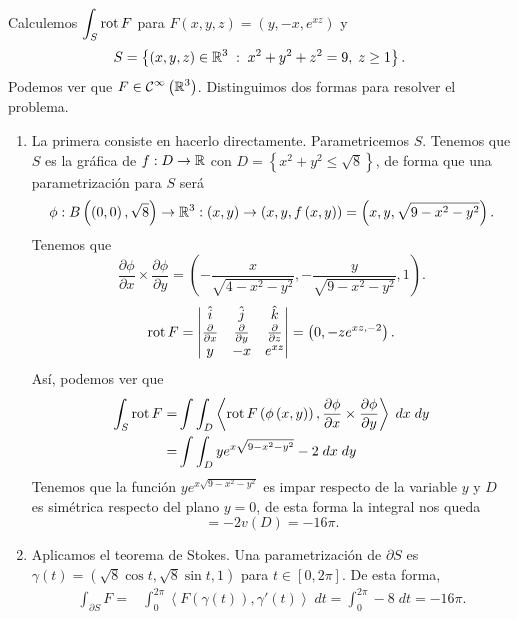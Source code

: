 \begin{eg}
	Calculemos $\displaystyle \int _{S}\operatorname{rot} F $ para $\displaystyle F\left(x,y,z\right)=\left(y,-x, e^{xz}\right) $ y 
	\[  S= \left\{ \left(x,y,z\right)\in \mathbb{R}^{3} \; : \; x^{2}+y^{2}+z^{2}=9, \; z \geq 1\right\}.\]
	Podemos ver que $\displaystyle F \in \mathcal{C}^{\infty}\left(\mathbb{R}^{3}\right) $. Distinguimos dos formas para resolver el problema.
	\begin{enumerate}
		\item La primera consiste en hacerlo directamente. Parametricemos $\displaystyle S $. Tenemos que $\displaystyle S $ es la gráfica de $\displaystyle f : D \to \mathbb{R} $ con $\displaystyle D = \left\{ x^{2}+y^{2}\leq \sqrt{8}\right\}  $, de forma que una parametrización para $\displaystyle S $ será
			\[\phi : B\left(\left(0,0\right), \sqrt{8}\right)\to \mathbb{R}^{3} : \left(x,y\right)\to \left(x,y,f\left(x,y\right)\right)=\left(x,y,\sqrt{9-x^{2}-y^{2}}\right) .\]
		Tenemos que 
		\[\frac{\partial \phi}{\partial x}\times \frac{\partial \phi}{\partial y}=\left(-\frac{x}{\sqrt{4-x^{2}-y^{2}}}, -\frac{y}{\sqrt{9 -x^{2}-y^{2}}}, 1\right) .\]
		\[\operatorname{rot} F = \begin{vmatrix} \hat{i} & \hat{j} & \hat{k} \\ \frac{\partial }{\partial x} & \frac{\partial }{\partial y} & \frac{\partial }{\partial z} \\ y & - x & e^{xz} \end{vmatrix} =\left(0, -ze^{xz, - 2}\right) .\]
		Así, podemos ver que 
		\[
		\begin{split}
			\int _{S}\operatorname{rot} F = & \int \int _{D}\left\langle \operatorname{rot} F\left(\phi\left(x,y\right)\right), \frac{\partial \phi}{\partial x}\times \frac{\partial \phi}{\partial y} \right\rangle  \; dx \; dy \\
			= & \int \int _{D}ye^{x\sqrt{9-x^{2}-y^{2}}}-2 \; dx \; dy 
		\end{split}
		\]
	Tenemos que la función $\displaystyle ye^{x\sqrt{9-x^{2}-y^{2}}} $ es impar respecto de la variable $\displaystyle y $ y $\displaystyle D $ es simétrica respecto del plano $\displaystyle y = 0 $, de esta forma la integral nos queda
	\[=-2v\left(D\right)=-16\pi  .\]
\item Aplicamos el teorema de Stokes. Una parametrización de $\displaystyle \partial S $ es $\displaystyle \gamma\left(t\right)=\left(\sqrt{8}\cos t, \sqrt{8}\sin t, 1\right) $ para $\displaystyle t \in \left[0, 2\pi \right]  $. De esta forma, 
	\[
	\begin{split}
		\int _{\partial S}F = & \int^{2\pi }_{0} \left\langle F\left(\gamma\left(t\right)\right), \gamma'\left(t\right) \right\rangle  \; dt=\int^{2\pi }_{0} -8 \; dt = - 16\pi  .
	\end{split}
	\]
	\end{enumerate}
\end{eg}
